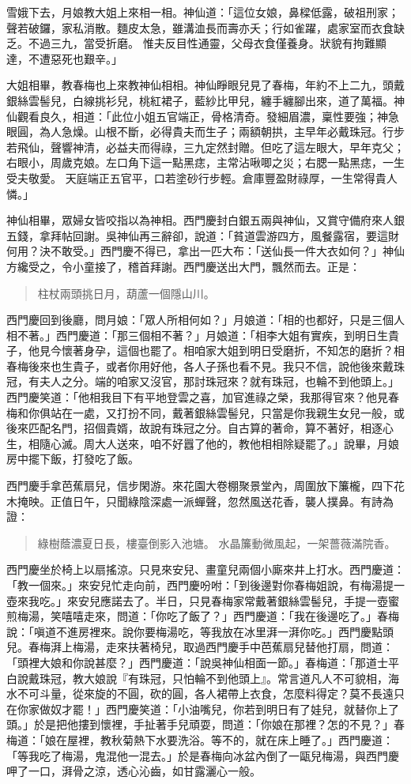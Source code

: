 雪娥下去，月娘教大姐上來相一相。神仙道：「這位女娘，鼻樑低露，破祖刑家；聲若破鑼，家私消散。麵皮太急，雖溝洫長而壽亦夭；行如雀躍，處家室而衣食缺乏。不過三九，當受折磨。
惟夫反目性通靈，父母衣食僅養身。狀貌有拘難顯達，不遭惡死也艱辛。」

大姐相畢，教春梅也上來教神仙相相。神仙睜眼兒見了春梅，年約不上二九，頭戴銀絲雲髻兒，白線挑衫兒，桃紅裙子，藍紗比甲兒，纏手纏腳出來，道了萬福。神仙觀看良久，相道：「此位小姐五官端正，骨格清奇。發細眉濃，稟性要強；神急眼圓，為人急燥。山根不斷，必得貴夫而生子；兩額朝拱，主早年必戴珠冠。行步若飛仙，聲響神清，必益夫而得祿，三九定然封贈。但吃了這左眼大，早年克父；右眼小，周歲克娘。左口角下這一點黑痣，主常沾啾唧之災；右腮一點黑痣，一生受夫敬愛。
天庭端正五官平，口若塗砂行步輕。倉庫豐盈財祿厚，一生常得貴人憐。」

神仙相畢，眾婦女皆咬指以為神相。西門慶封白銀五兩與神仙，又賞守備府來人銀五錢，拿拜帖回謝。吳神仙再三辭卻，說道：「貧道雲游四方，風餐露宿，要這財何用？決不敢受。」西門慶不得已，拿出一匹大布：「送仙長一件大衣如何？」神仙方纔受之，令小童接了，稽首拜謝。西門慶送出大門，飄然而去。正是：
\begin{quote}
柱杖兩頭挑日月，葫蘆一個隱山川。
\end{quote}

西門慶回到後廳，問月娘：「眾人所相何如？」月娘道：「相的也都好，只是三個人相不著。」西門慶道：「那三個相不著？」月娘道：「相李大姐有實疾，到明日生貴子，他見今懷著身孕，這個也罷了。相咱家大姐到明日受磨折，不知怎的磨折？相春梅後來也生貴子，或者你用好他，各人子孫也看不見。我只不信，說他後來戴珠冠，有夫人之分。端的咱家又沒官，那討珠冠來？就有珠冠，也輪不到他頭上。」西門慶笑道：「他相我目下有平地登雲之喜，加官進祿之榮，我那得官來？他見春梅和你俱站在一處，又打扮不同，戴著銀絲雲髻兒，只當是你我親生女兒一般，或後來匹配名門，招個貴婿，故說有珠冠之分。自古算的著命，算不著好，相逐心生，相隨心滅。周大人送來，咱不好囂了他的，教他相相除疑罷了。」說畢，月娘房中擺下飯，打發吃了飯。

西門慶手拿芭蕉扇兒，信步閑游。來花園大卷棚聚景堂內，周圍放下簾櫳，四下花木掩映。正值日午，只聞綠陰深處一派蟬聲，忽然風送花香，襲人撲鼻。有詩為證：
\begin{quote}
綠樹蔭濃夏日長，樓臺倒影入池塘。
水晶簾動微風起，一架薔薇滿院香。
\end{quote}

西門慶坐於椅上以扇搖涼。只見來安兒、畫童兒兩個小廝來井上打水。西門慶道：「教一個來。」來安兒忙走向前，西門慶吩咐：「到後邊對你春梅姐說，有梅湯提一壺來我吃。」來安兒應諾去了。半日，只見春梅家常戴著銀絲雲髻兒，手提一壺蜜煎梅湯，笑嘻嘻走來，問道：「你吃了飯了？」西門慶道：「我在後邊吃了。」春梅說：「嗔道不進房裡來。說你要梅湯吃，等我放在冰里湃一湃你吃。」西門慶點頭兒。春梅湃上梅湯，走來扶著椅兒，取過西門慶手中芭蕉扇兒替他打扇，問道：「頭裡大娘和你說甚麼？」西門慶道：「說吳神仙相面一節。」春梅道：「那道士平白說戴珠冠，教大娘說『有珠冠，只怕輪不到他頭上』。常言道凡人不可貌相，海水不可斗量，從來旋的不圓，砍的圓，各人裙帶上衣食，怎麼料得定？莫不長遠只在你家做奴才罷！」西門慶笑道：「小油嘴兒，你若到明日有了娃兒，就替你上了頭。」於是把他摟到懷裡，手扯著手兒頑耍，問道：「你娘在那裡？怎的不見？」春梅道：「娘在屋裡，教秋菊熱下水要洗浴。等不的，就在床上睡了。」西門慶道：「等我吃了梅湯，鬼混他一混去。」於是春梅向冰盆內倒了一甌兒梅湯，與西門慶呷了一口，湃骨之涼，透心沁齒，如甘露灑心一般。

